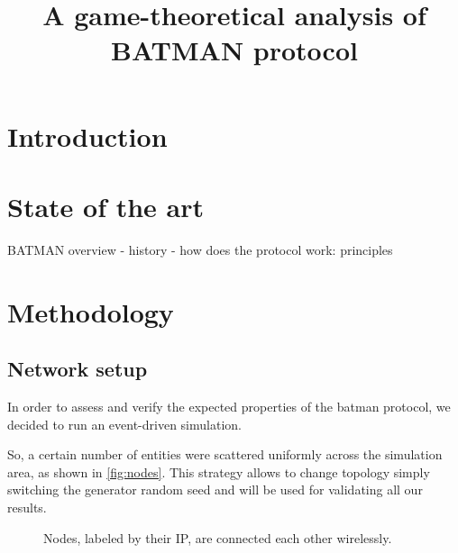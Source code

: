 \documentclass[conference]{IEEEtran}
\begin{document}
\title{A game-theoretical analysis of BATMAN protocol}

\author{
\and
{}
}

\maketitle

\begin{abstract}

\end{abstract}

\section{Introduction}

\section{State of the art}

BATMAN overview
- history
- how does the protocol work: principles

\section{Methodology}

\subsection{Network setup}

In order to assess and verify the expected properties of the \gls{batman}
protocol, we decided to run an event-driven simulation.

So, a certain number of entities were scattered uniformly across the simulation
area, as shown in \autoref{fig:nodes}. This strategy allows to change topology
simply switching the generator random seed and will be used for validating all our results.

\begin{figure}[h]
  \centering
  \caption{Nodes, labeled by their IP, are connected each other wirelessly.}
  \label{fig:nodes}
\end{figure}
\end{document}
